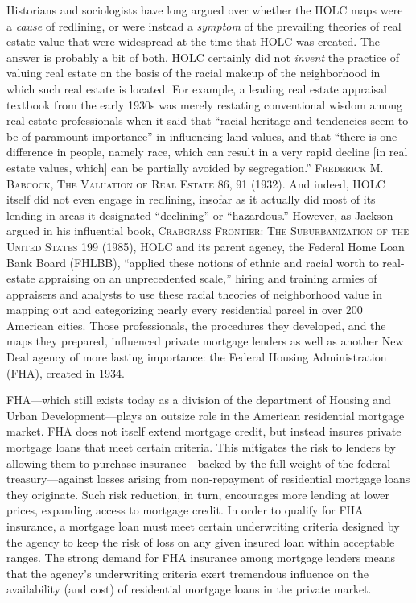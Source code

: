 Historians and sociologists have long argued over whether the HOLC maps were a
\textit{cause} of redlining, or were instead a \textit{symptom} of the
prevailing theories of real estate value that were widespread at the time that
HOLC was created. The answer is probably a bit of both. HOLC certainly did not
\textit{invent} the practice of valuing real estate on the basis of the racial
makeup of the neighborhood in which such real estate is located. For example, a
leading real estate appraisal textbook from the early 1930s was merely
restating conventional wisdom among real estate professionals when it said that
``racial heritage and tendencies seem to be of paramount importance'' in
influencing land values, and that ``there is one difference in people, namely
race, which can result in a very rapid decline [in real estate values, which]
can be partially avoided by segregation.'' \textsc{Frederick M. Babcock, The
Valuation of Real Estate} 86, 91 (1932). And indeed, HOLC itself did not even
engage in redlining, insofar as it actually did most of its lending in areas it
designated ``declining'' or ``hazardous.'' However, as Jackson argued in his
influential book, \textsc{Crabgrass Frontier: The Suburbanization of the United
States}\textit{ }199 (1985), HOLC and its parent agency, the Federal Home Loan
Bank Board (FHLBB), ``applied these notions of ethnic and racial worth to
real-estate appraising on an unprecedented scale,'' hiring and training armies
of appraisers and analysts to use these racial theories of neighborhood value
in mapping out and categorizing nearly every residential parcel in over 200
American cities. Those professionals, the procedures they developed, and the
maps they prepared, influenced private mortgage lenders as well as another New
Deal agency of more lasting importance: the Federal Housing Administration
(FHA), created in 1934.

FHA---which still exists today as a division of the department of Housing and
Urban Development---plays an outsize role in the American residential mortgage
market. FHA does not itself extend mortgage credit, but instead insures private
mortgage loans that meet certain criteria. This mitigates the risk to lenders
by allowing them to purchase insurance---backed by the full weight of the
federal treasury---against losses arising from non-repayment of residential
mortgage loans they originate. Such risk reduction, in turn, encourages more
lending at lower prices, expanding access to mortgage credit. In order to
qualify for FHA insurance, a mortgage loan must meet certain underwriting
criteria designed by the agency to keep the risk of loss on any given insured
loan within acceptable ranges. The strong demand for FHA insurance among
mortgage lenders means that the agency's underwriting criteria exert tremendous
influence on the availability (and cost) of residential mortgage loans in the
private market. 

